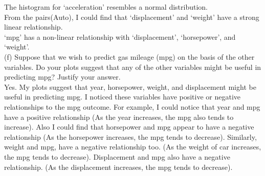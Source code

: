 \documentclass{article}
\begin{document}
\linebreak 
\indent * The histogram for `acceleration' resembles a normal distribution. \\
\indent * From the pairs(Auto), I could find that `displacement' and `weight' have a strong linear relationship. \\
\indent  * `mpg' has a non-linear relationship with `displacement', `horsepower', and `weight'. \\
\linebreak (f) Suppose that we wish to predict gas mileage (mpg) on the basis of the other variables. Do your plots suggest that any of the other variables might be useful in predicting mpg? Justify your answer. \\
\indent\indent Yes. My plots suggest that year, horsepower, weight, and displacement might be useful in predicting mpg. I noticed these variables have positive or negative relationships to the mpg outcome. For example, I could notice that year and mpg have a positive relationship (As the year increases, the mpg also tends to increase). Also I could find that horsepower and mpg appear to have a negative relationship (As the horsepower increases, the mpg tends to decrease). Similarly, weight and mpg, have a negative relationship too. (As the weight of car increases, the mpg tends to decrease). Displacement and mpg also have a negative relationship. (As the displacement increases, the mpg tends to decrease). 
\end{document}
